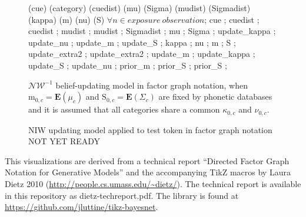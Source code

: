 \documentclass[11pt]{report}
\begin{document}
\begin{figure}
{     {(cue) (category) (cuedist) (mu) (Sigma) (mudist) (Sigmadist) (kappa) (m) (nu) (S)} {$\forall n \in exposure\ observation$}; %
     {cue} ; %
     {cuedist} ; %
     {cuedist} ; %
     {mudist} ; %
     {mudist} ; %
     {Sigmadist} ; %
     {mu} ; %
     {Sigma} ; %
     {update_kappa} ; %
     {update_nu} ; %
     {update_m} ; %
     {update_S} ; %
     {kappa} ; %
     {nu} ; %
     {m} ; %
     {S} ; %
     {update_extra2} ; %
     {update_extra2} ; %
     {update_m} ; %
     {update_kappa} ; %
     {update_S} ; %
     {update_nu} ; %
     {prior_m} ;
     {prior_S} ;
     {prior_S} ;
  }
  \caption{$\mathcal{NW}^{-1}$ belief-updating model in factor graph notation, when $\mathrm{m}_{0,c} = \mathbf{E}(\mu_c)$ and $\mathrm{S}_{0,c}=\mathbf{E}(\Sigma_c)$ are fixed by phonetic databases and it is assumed that all categories share a common $\kappa_{0,c}$ and $\nu_{0,c}$.}
\end{figure}


\begin{figure}
  \centering
  \caption{NIW updating model applied to test token in factor graph notation NOT YET READY}
\end{figure}


This visualizations are derived from a technical report ``Directed Factor Graph Notation for Generative Models'' and the accompanying TikZ macros by Laura Dietz 2010 (\url{http://people.cs.umass.edu/~dietz/}). The technical report is available in this repository as dietz-techreport.pdf. The library is found at \url{https://github.com/jluttine/tikz-bayesnet}.
\end{document}
